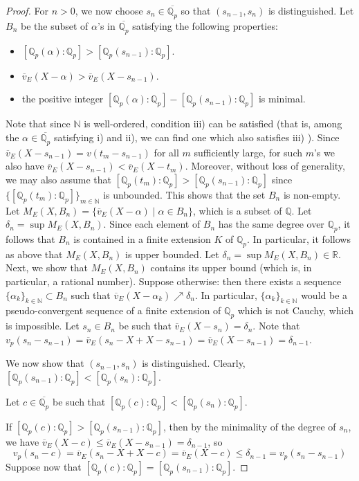 \documentclass[10pt]{article}
\numberwithin{equation}{section}
\theoremstyle{definition}\newtheorem{Def}[equation]{Definition}
\theoremstyle{definition}\newtheorem{Ques}[equation]{Question}
\newcommand{\Q}{\mathbb{Q}}
\newcommand{\N}{\mathbb{N}}
\newcommand{\R}{\mathbb{R}}
\newcommand{\oQp}{\overline{\Q_p}}
\begin{document}
\begin{proof}
For $n>0$, we now choose $s_n\in\oQp$ so that $(s_{n-1},s_n)$ is distinguished. Let $B_n$ be the subset of $\alpha$'s in $\oQp$ satisfying the following properties:
\begin{itemize}
\item[i)] $[\Q_p(\alpha):\Q_p]>[\Q_p(s_{n-1}):\Q_p]$.
\item[ii)] $\overline v_E(X-\alpha)>\overline v_E(X-s_{n-1})$.
\item[iii)] the positive integer $[\Q_p(\alpha):\Q_p]-[\Q_p(s_{n-1}):\Q_p]$  is minimal.
\end{itemize}
Note that since $\N$ is well-ordered, condition iii) can be satisfied (that is, among the $\alpha\in\oQp$ satisfying i) and ii), we can find one which also satisfies iii) ). Since $\overline v_E(X-s_{n-1})=v(t_m-s_{n-1})$ for all $m$ sufficiently large, for such $m$'s we also have $\overline v_E(X-s_{n-1})<\overline v_E(X-t_m)$. Moreover, without loss of generality, we may also assume that $[\Q_p(t_m):\Q_p]>[\Q_p(s_{n-1}):\Q_p]$ since $\{[\Q_p(t_m):\Q_p]\}_{m\in\N}$ is unbounded.  This shows that the set $B_n$ is non-empty. Let $M_E(X,B_n)=\{\overline v_E(X-\alpha)\mid\alpha\in B_n\}$, which is a subset of $\Q$. Let $\delta_n=\sup M_E(X,B_n)$. Since each element of $B_n$ has the same degree over $\Q_p$, it follows that $B_n$ is contained in a finite extension $K$ of $\Q_p$. In particular, it follows as above that $M_E(X,B_n)$ is upper bounded. Let $\delta_n=\sup M_E(X,B_n)\in\R$. Next, we show that $M_E(X,B_n)$ contains its upper bound (which is, in particular, a rational number). Suppose otherwise: then there exists a sequence $\{\alpha_k\}_{k\in\N}\subset B_n$ such that $\overline v_E(X-\alpha_k)\nearrow\delta_n$. In particular, $\{\alpha_k\}_{k\in\N}$ would be a pseudo-convergent sequence of a finite extension of $\Q_p$ which is not Cauchy, which is impossible. Let $s_n\in B_n$ be such that $\overline v_E(X-s_n)=\delta_n$. Note that $v_p(s_n-s_{n-1})=\overline v_E(s_n-X+X-s_{n-1})=\overline v_E(X-s_{n-1})=\delta_{n-1}$. 

We now show that $(s_{n-1},s_n)$ is distinguished.  Clearly, $[\Q_p(s_{n-1}):\Q_p]<[\Q_p(s_n):\Q_p]$. 

Let $c\in\oQp$ be such that $[\Q_p(c):\Q_p]<[\Q_p(s_n):\Q_p]$. 

If $[\Q_p(c):\Q_p]>[\Q_p(s_{n-1}):\Q_p]$, then by the minimality of the degree of $s_n$, we have $\overline v_E(X-c)\leq \overline v_E(X-s_{n-1})=\delta_{n-1}$, so
$$v_p(s_n-c)=\overline v_E(s_n-X+X-c)=\overline v_E(X-c)\leq \delta_{n-1}=v_p(s_n-s_{n-1})$$
Suppose now that $[\Q_p(c):\Q_p]=[\Q_p(s_{n-1}):\Q_p]$.


\end{proof}
\end{document}
